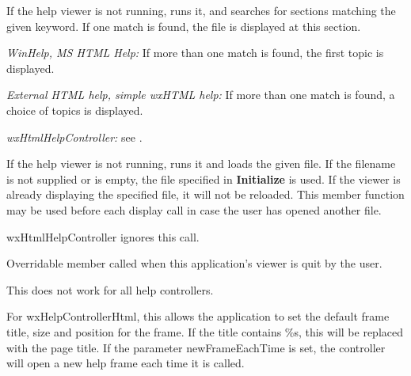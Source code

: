 \label{wxhelpcontrollerkeywordsearch}


If the help viewer is not running, runs it, and searches for sections matching the given keyword. If one
match is found, the file is displayed at this section.

{\it WinHelp, MS HTML Help:} If more than one match is found, 
the first topic is displayed.

{\it External HTML help, simple wxHTML help:} If more than one match is found, 
a choice of topics is displayed.

{\it wxHtmlHelpController:} see .

\label{wxhelpcontrollerloadfile}


If the help viewer is not running, runs it and loads the given file.
If the filename is not supplied or is
empty, the file specified in {\bf Initialize} is used. If the viewer is
already displaying the specified file, it will not be reloaded. This
member function may be used before each display call in case the user
has opened another file.

wxHtmlHelpController ignores this call.

\label{wxhelpcontrolleronquit}


Overridable member called when this application's viewer is quit by the user.

This does not work for all help controllers.

\label{wxhelpcontrollersetframeparameters}


For wxHelpControllerHtml, this allows the application to set the
default frame title, size and position for the frame. If the title
contains \%s, this will be replaced with the page title. If the
parameter newFrameEachTime is set, the controller will open a new
help frame each time it is called.

